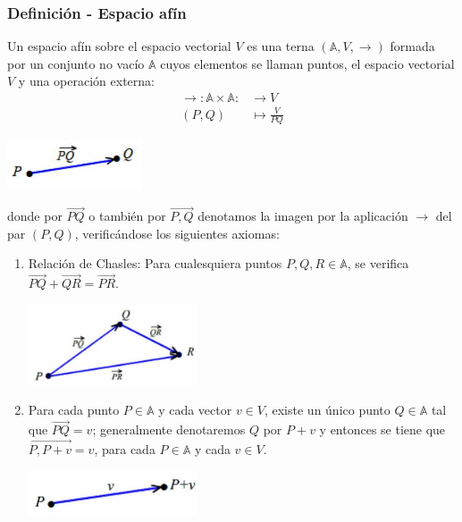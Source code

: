 \documentclass[12pt, a4paper, ones, notitlepage, openany,titlepage]{article}
\begin{document}
\subsubsection{Definición - Espacio afín}
Un espacio afín sobre el espacio vectorial $V$ es una terna $(\mathbb{A}, V, \rightarrow)$ formada por un conjunto no vacío $\mathbb{A}$ cuyos elementos se llaman puntos, el espacio vectorial $V$ y una operación externa:
$$
\begin{aligned}
\rightarrow: \mathbb{A} \times \mathbb{A}: & \longrightarrow V \\
(P, Q) & \longmapsto \frac{V}{P Q}
\end{aligned}
$$
\begin{center}
\includegraphics[max width=4cm]{2023_03_01_7659aec5e35f9a9b2d3cg-01(1)}
\end{center}

\noindent donde por $\overrightarrow{P Q}$ o también por $\overrightarrow{P, Q}$ denotamos la imagen por la aplicación $\rightarrow$ del par $(P, Q)$, verificándose los siguientes axiomas:

\begin{enumerate}
	\item Relación de Chasles: Para cualesquiera puntos $P, Q, R \in \mathbb{A}$, se verifica $\overrightarrow{P Q}+\overrightarrow{Q R}=\overrightarrow{P R}$.
	
	\begin{center}
	\includegraphics[max width=5cm]{2023_03_01_7659aec5e35f9a9b2d3cg-01}
	\end{center}
	
	\item Para cada punto $P \in \mathbb{A}$ y cada vector $v \in V$, existe un único punto $Q \in \mathbb{A}$ tal que $\overrightarrow{P Q}=v$; generalmente denotaremos $Q$ por $P+v$ y entonces se tiene que $\overrightarrow{P, P+v}=v$, para cada $P \in \mathbb{A}$ y cada $v \in V$.
	\begin{center}
		\includegraphics[max width=5cm]{2023_03_01_7659aec5e35f9a9b2d3cg-01(2)}
	\end{center}
\end{enumerate}
\end{document}
